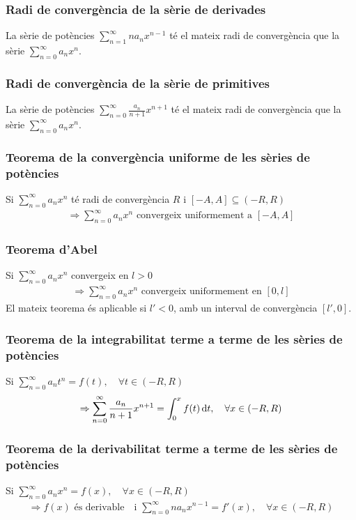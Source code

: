 \subsubsection*{Radi de convergència de la sèrie de derivades}
La sèrie de potències $\sum_{n=1}^{\infty} na_{n} x^{n-1}$ té el mateix radi de convergència que la sèrie $\sum_{n=0}^{\infty} a_{n} x^{n}$.

\subsubsection*{Radi de convergència de la sèrie de primitives}
La sèrie de potències $\sum_{n=0}^{\infty} \frac{a_{n}}{n+1} x^{n+1}$ té el mateix radi de convergència que la sèrie $\sum_{n=0}^{\infty} a_{n} x^{n}$.

\subsubsection*{Teorema de la convergència uniforme de les sèries de potències}
Si $\sum_{n=0}^{\infty} a_{n} x^{n}$ té radi de convergència $R$ i $[-A, A] \subseteq (-R, R)$
\begin{align}
    \Rightarrow \sum\limits_{n=0}^{\infty} a_{n} x^{n} \text{ convergeix uniformement a } [-A, A]
\end{align}

\subsubsection*{Teorema d'Abel}
Si $\sum_{n=0}^{\infty} a_{n} x^{n}$ convergeix en $l > 0$
\begin{align}
    \Rightarrow \sum\limits_{n=0}^{\infty} a_{n} x^{n} \text{ convergeix uniformement en } [0, l]
\end{align}
El mateix teorema és aplicable si $l' < 0$, amb un interval de convergència $[l', 0]$.

\subsubsection*{Teorema de la integrabilitat terme a terme de les sèries de potències}
Si $\sum_{n=0}^{\infty} a_{n} t^{n} = f(t), \quad \forall t \in (-R, R)$
\begin{align}
    \Rightarrow \sum\limits_{n=0}^{\infty} \frac{a_{n}}{n+1} x^{n+1} = \int_{0}^{x} f(t) \mathop{}\!\mathrm{d} t , \quad \forall x \in (-R, R)
\end{align}

\subsubsection*{Teorema de la derivabilitat terme a terme de les sèries de potències}
Si $\sum_{n=0}^{\infty} a_{n} x^{n} = f(x), \quad \forall x \in (-R, R)$
\begin{align}
    \Rightarrow f(x) \text{ és derivable} \quad \text{i } \sum\limits_{n=0}^{\infty} na_{n} x^{n-1} = f'(x), \quad \forall x \in (-R, R)
\end{align}


